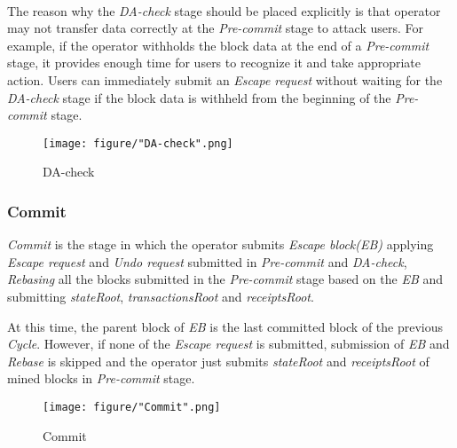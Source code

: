 \documentclass[letterpaper, 11pt]{article}
\begin{document}
\begin{CJK}{UTF8}{mj}
\paragraph{}
The reason why the \emph{DA-check} stage should be placed explicitly is that operator may not transfer data correctly at the \emph{Pre-commit} stage to attack users. For example, if the operator withholds the block data at the end of a \emph{Pre-commit} stage, it provides enough time for users to recognize it and take appropriate action. Users can immediately submit an \emph{Escape request} without waiting for the \emph{DA-check} stage if the block data is withheld from the beginning of the \emph{Pre-commit} stage.



\begin{figure}[!h]
\centering
\texttt{[image: figure/"DA-check".png]}
\caption{DA-check}
\label{fig:da-check}
\end{figure}

\end{CJK}

\subsubsection{Commit}
\begin{CJK}{UTF8}{mj}
\emph{Commit} is the stage in which the operator submits \emph{Escape block(EB)} applying \emph{Escape request} and \emph{Undo request} submitted in \emph{Pre-commit} and \emph{DA-check}, \emph{Rebasing} all the blocks submitted in the \emph{Pre-commit} stage based on the \emph{EB} and submitting \emph{stateRoot}, \emph{transactionsRoot} and \emph{receiptsRoot}.

At this time, the parent block of \emph{EB} is the last committed block of the previous \emph{Cycle}. However, if none of the \emph{Escape request} is submitted, submission of \emph{EB} and \emph{Rebase} is skipped and the operator just submits \emph{stateRoot} and \emph{receiptsRoot} of mined blocks in \emph{Pre-commit} stage.

\begin{figure}[!h]
\centering
\texttt{[image: figure/"Commit".png]}
\caption{Commit}
\label{fig:commit-diagram}
\end{figure}

\end{CJK}
\end{document}

